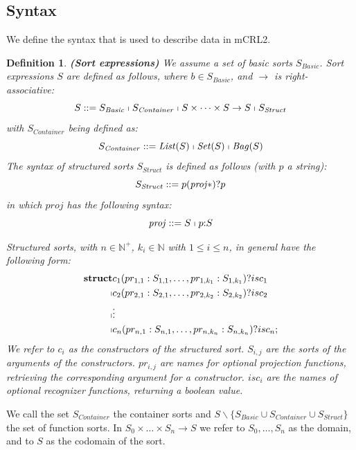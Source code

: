 \documentclass[a4paper,11pt]{article}
\newcommand{\Nats}{{\mathbb N}}    %
\newcommand{\Natspos}{{\mathbb N^+}} %
\newcommand{\List}{{\mathit{List}}}
\newcommand{\Set}{{\mathit{Set}}}
\newcommand{\Bag}{{\mathit{Bag}}}
\newcommand{\basicsort}{{S_{\mathit{Basic}}}}
\newcommand{\containersort}{{S_{\mathit{Container}}}}
\newcommand{\structsort}{{S_{\mathit{Struct}}}}
\newtheorem{thdefinition}{Definition}[section]
\newenvironment{definition}
  {\begin{thdefinition}\em}
  {\end{thdefinition}}
\begin{document}
\subsection{Syntax}
We define the syntax that is used to describe data in mCRL2.

\begin{definition}\textbf{(Sort expressions)}
We assume a set of basic sorts $\basicsort$.
Sort expressions $S$ are defined as follows, where $b \in \basicsort$, and $\rightarrow$ is right-associative:
\begin{equation*}
 S ::= \basicsort \shortmid \containersort \shortmid S \times \dots \times S \rightarrow S \shortmid \structsort
\end{equation*}
with $\containersort$ being defined as:
\begin{equation*}
 \containersort ::= \List(S) \shortmid \Set(S) \shortmid \Bag(S)
\end{equation*}
The syntax of structured sorts $\structsort$ is defined as follows (with $p$ a string):
\begin{equation*}
 \structsort ::= p({\it proj}*)?p
\end{equation*}
in which $proj$ has the following syntax:
\begin{equation*}
 {\it proj} ::= S \shortmid p{:}S
\end{equation*}

Structured sorts, with $n \in \Natspos$, $k_i \in \Nats$ with $1 \leq i \leq n$, in general have the following form:
\begin{eqnarray*}
\textbf{struct} & c_1(pr_{1,1}:S_{1,1}, \dots, pr_{1,k_1}:S_{1,k_1})?isc_1\\
              \shortmid & c_2(pr_{2,1}:S_{2,1}, \dots, pr_{2,k_2}:S_{2,k_2})?isc_2\\
              \shortmid & \vdots\\
              \shortmid & c_n(pr_{n,1}:S_{n,1}, \dots, pr_{n,k_n}:S_{n,k_n})?isc_n;
\end{eqnarray*}
We refer to $c_i$ as the constructors of the structured sort. $S_{i,j}$ are the sorts of the arguments of the constructors. $pr_{i,j}$ are names for optional projection functions, retrieving the corresponding argument for a constructor. $isc_i$ are the names of optional recognizer functions, returning a boolean value.
\end{definition}
We call the set  $\containersort$ the container sorts and $S \backslash \{ \basicsort \cup \containersort \cup \structsort \}$ the set of function sorts. In $S_0 \times \dots \times S_n \rightarrow S$ we refer to $S_0, \dots, S_n$ as the domain, and to $S$ as the codomain of the sort.
\end{document}
